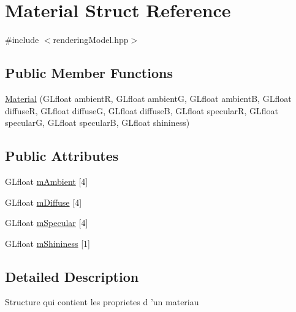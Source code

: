 \hypertarget{struct_material}{\section{Material Struct Reference}
\label{struct_material}
}


{\ttfamily \#include $<$rendering\+Model.\+hpp$>$}

\subsection*{Public Member Functions}
\begin{DoxyCompactItemize}
\item 
\hyperlink{struct_material_ad2dfa8adf3cec0143e3f804c47588b8c}{Material} (G\+Lfloat ambient\+R, G\+Lfloat ambient\+G, G\+Lfloat ambient\+B, G\+Lfloat diffuse\+R, G\+Lfloat diffuse\+G, G\+Lfloat diffuse\+B, G\+Lfloat specular\+R, G\+Lfloat specular\+G, G\+Lfloat specular\+B, G\+Lfloat shininess)
\end{DoxyCompactItemize}
\subsection*{Public Attributes}
\begin{DoxyCompactItemize}
\item 
G\+Lfloat \hyperlink{struct_material_a9df39adc76f8131ff7c071339bd09eac}{m\+Ambient} \mbox{[}4\mbox{]}
\item 
G\+Lfloat \hyperlink{struct_material_acedb2e5253e0891df7870845793f5ca2}{m\+Diffuse} \mbox{[}4\mbox{]}
\item 
G\+Lfloat \hyperlink{struct_material_a1cab5986665fe4aaa3c9657ad513f596}{m\+Specular} \mbox{[}4\mbox{]}
\item 
G\+Lfloat \hyperlink{struct_material_a6b74b1568a229d6f3306ce9c127ae256}{m\+Shininess} \mbox{[}1\mbox{]}
\end{DoxyCompactItemize}


\subsection{Detailed Description}
Structure qui contient les proprietes d ’un materiau 

